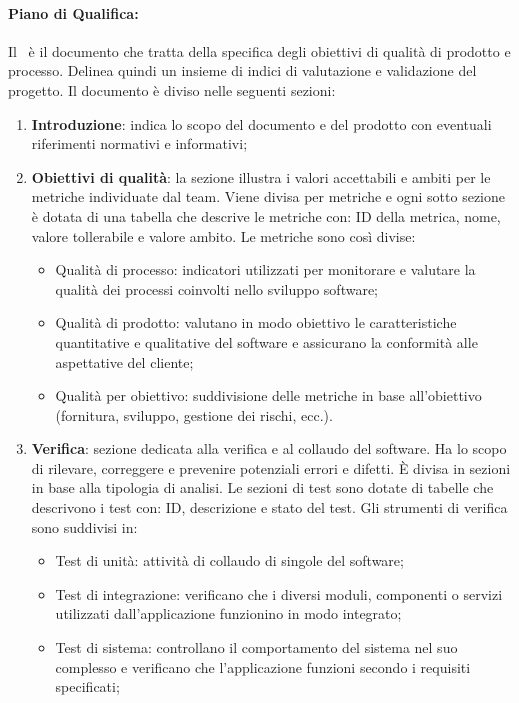 \paragraph{Piano di Qualifica:}
Il \PdQ\ è il documento che tratta della specifica degli obiettivi di qualità di prodotto e processo. Delinea quindi un insieme di indici di valutazione e validazione del progetto.
Il documento è diviso nelle seguenti sezioni:
\begin{enumerate}
  \item \textbf{Introduzione}: indica lo scopo del documento e del prodotto con eventuali riferimenti normativi e informativi;
  \item \textbf{Obiettivi di qualità}: la sezione illustra i valori accettabili e ambiti per le metriche individuate dal team. Viene divisa per metriche e ogni sotto sezione è dotata di una tabella che descrive le metriche con: ID della metrica, nome, valore tollerabile e valore ambito. Le metriche sono così divise:
  \begin{itemize}
    \item Qualità di processo: indicatori utilizzati per monitorare e valutare la qualità dei processi coinvolti nello sviluppo software;
    \item Qualità di prodotto: valutano in modo obiettivo le caratteristiche quantitative e qualitative del software e assicurano la conformità alle aspettative del cliente;
    \item Qualità per obiettivo: suddivisione delle metriche in base all'obiettivo (fornitura, sviluppo, gestione dei rischi, ecc.).
  \end{itemize}
  \item \textbf{Verifica}: sezione dedicata alla verifica e al collaudo del software. Ha lo scopo di rilevare, correggere e prevenire potenziali errori e difetti. È divisa in sezioni in base alla tipologia di analisi. Le sezioni di test sono dotate di tabelle che descrivono i test con: ID, descrizione e stato del test. Gli strumenti di verifica sono suddivisi in:
  \begin{itemize}
    \item Test di unità: attività di collaudo di singole  del software;
    \item Test di integrazione: verificano che i diversi moduli, componenti o servizi utilizzati dall’applicazione funzionino in modo integrato;
    \item Test di sistema: controllano il comportamento del sistema nel suo complesso e verificano che l’applicazione funzioni secondo i requisiti specificati;

\end{itemize}
\end{enumerate}
